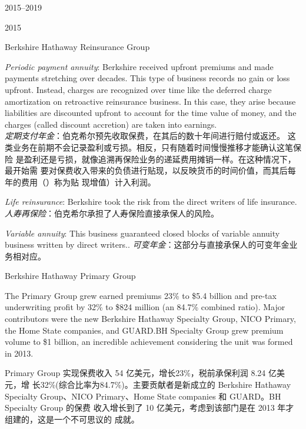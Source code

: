 \begin{chapter}{2015--2019}
\begin{section}{2015}
\begin{subsection}{Berkshire Hathaway Reinsurance Group}
\begin{verseparallel}
  {
    \textit{Periodic payment annuity}: Berkshire received upfront premiums and
    made payments stretching over decades. This type of business records
    no gain or loss upfront. Instead, charges are recognized over time like
    the deferred charge amortization on retroactive reinsurance business.
    In this case, they arise because liabilities are discounted upfront to
    account for the time value of money, and the charges (called discount
    accretion) are taken into earnings. \\
  }
  {
    \textit{定期支付年金}：伯克希尔预先收取保费，在其后的数十年间进行赔付或返还。
    这类业务在前期不会记录盈利或亏损。相反，只有随着时间慢慢推移才能确认这笔保险
    是盈利还是亏损，就像追溯再保险业务的递延费用摊销一样。在这种情况下，最开始需
    要对保费收入带来的负债进行贴现，以反映货币的时间价值，而其后每年的费用（）称为贴
    现增值）计入利润。
  }
\end{verseparallel}

\begin{verseparallel}
  {
    \textit{Life reinsurance}: Berkshire took the risk from the direct writers of
    life insurance.
  }
  {
    \textit{人寿再保险}：伯克希尔承担了人寿保险直接承保人的风险。
  }
\end{verseparallel}

\begin{verseparallel}
  {
    \textit{Variable annuity}: This business guaranteed closed blocks of
    variable annuity business written by direct writers..
  }
  {
    \textit{可变年金}：这部分与直接承保人的可变年金业务相对应。
  }
\end{verseparallel}

\end{subsection}

\begin{subsection}{Berkshire Hathaway Primary Group}
\begin{verseparallel}
  {

    The Primary Group grew earned premiums 23\% to \$5.4 billion and pre-tax
    underwriting profit by 32\% to \$824 million (an 84.7\% combined ratio).
    Major contributors were the new Berkshire Hathaway Specialty Group, NICO
    Primary, the Home State companies, and GUARD.\@ BH Specialty Group grew
    premium volume to \$1 billion, an incredible achievement considering the unit
    was formed in 2013.

  }
  {
    Primary Group 实现保费收入 54 亿美元，增长23\%，税前承保利润 8.24 亿美元，增
    长32\%(综合比率为84.7\%)。主要贡献者是新成立的 Berkshire Hathaway Specialty
    Group、NICO Primary、Home State companies 和 GUARD。BH Specialty Group 的保费
    收入增长到了 10 亿美元，考虑到该部门是在 2013 年才组建的，这是一个不可思议的
    成就。
  }
\end{verseparallel}


\end{subsection}
\end{section}
\end{chapter}
